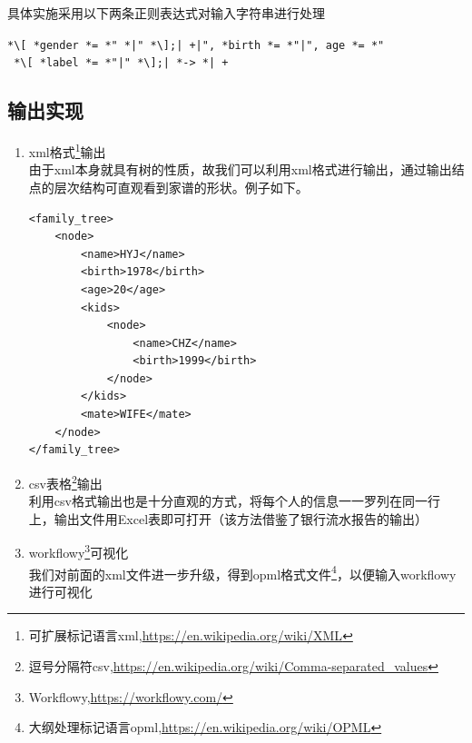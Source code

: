 \documentclass[12pt,UTF8]{ctexart}
\begin{document}
\begin{spacing}{1.4}
	具体实施采用以下两条正则表达式对输入字符串进行处理
	\begin{center}\verb'*\[ *gender *= *" *|" *\];| +|", *birth *= *"|", age *= *"'\\
	\verb' *\[ *label *= *"|" *\];| *-> *| +'\end{center}

\subsection{输出实现}
	\begin{enumerate}
		\item xml格式\footnote{可扩展标记语言xml,\url{https://en.wikipedia.org/wiki/XML}}输出\\
		由于xml本身就具有树的性质，故我们可以利用xml格式进行输出，通过输出结点的层次结构可直观看到家谱的形状。例子如下。
\begin{lstlisting}
<family_tree>
    <node>
        <name>HYJ</name>
        <birth>1978</birth>
        <age>20</age>
        <kids>
            <node>
                <name>CHZ</name>
                <birth>1999</birth>
            </node>
        </kids>
        <mate>WIFE</mate>
    </node>
</family_tree>
\end{lstlisting}
		\item csv表格\footnote{逗号分隔符csv,\url{https://en.wikipedia.org/wiki/Comma-separated_values}}输出\\
		利用csv格式输出也是十分直观的方式，将每个人的信息一一罗列在同一行上，输出文件用Excel表即可打开（该方法借鉴了银行流水报告的输出）
		\item workflowy\footnote{Workflowy,\url{https://workflowy.com/}}可视化\\
		我们对前面的xml文件进一步升级，得到opml格式文件\footnote{大纲处理标记语言opml,\url{https://en.wikipedia.org/wiki/OPML}}，以便输入workflowy进行可视化
	\end{enumerate}


\end{spacing}
\end{document}
